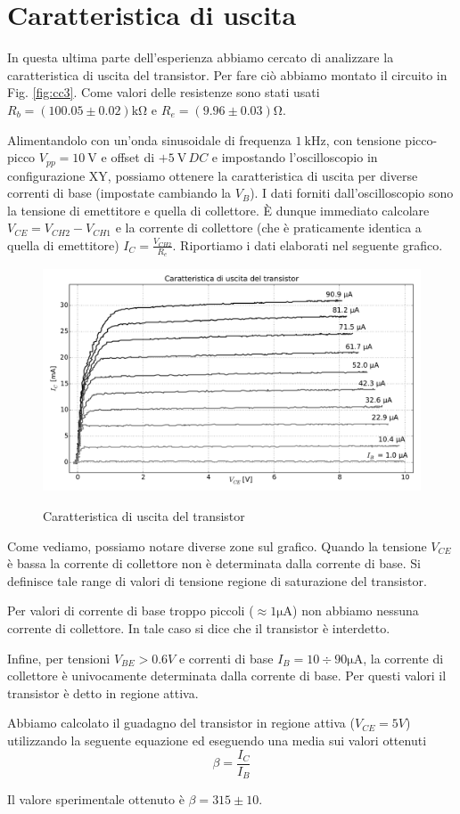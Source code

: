 \section{Caratteristica di uscita}

In questa ultima parte dell'esperienza abbiamo cercato di analizzare la caratteristica di uscita del transistor.
Per fare ciò abbiamo montato il circuito in Fig. \ref{fig:cc3}. Come valori delle resistenze sono stati usati $R_b=(100.05\pm0.02)\si{\kilo\ohm}$ e $R_e=(9.96\pm 0.03)\si{\ohm}$.

Alimentandolo con un'onda sinusoidale di frequenza $\SI{1}{\kilo\hertz}$, con tensione picco-picco $V_{pp} = \SI{10}{\volt}$ e offset di $+\SI{5}{\volt} \, DC$ e impostando l'oscilloscopio in configurazione XY, possiamo ottenere la caratteristica di uscita per diverse correnti di base (impostate cambiando la $V_B$).
I dati forniti dall'oscilloscopio sono la tensione di emettitore e quella di collettore. È dunque immediato calcolare $V_{CE}=V_{CH2}-V_{CH1}$ e la corrente di collettore (che è praticamente identica a quella di emettitore) $I_C=\frac{V_{CH2}}{R_e}$. Riportiamo i dati elaborati nel seguente grafico. 

\begin{figure}[h]
\centering
	\caption{Caratteristica di uscita del transistor}
	\includegraphics[scale=0.45]{xy.pdf}
	\label{fig:xy}
\end{figure}

Come vediamo, possiamo notare diverse zone sul grafico. Quando la tensione $V_{CE}$ è bassa la corrente di collettore non è determinata dalla corrente di base. Si definisce tale range di valori di tensione regione di saturazione del transistor. 

Per valori di corrente di base troppo piccoli ($\approx 1 \si{\micro\ampere}$) non abbiamo nessuna corrente di collettore. In tale caso si dice che il transistor è interdetto.

Infine, per tensioni $V_{BE}>0.6V$ e correnti di base $I_B=10 \div 90 \si{\micro	\ampere}$, la corrente di collettore è univocamente determinata dalla corrente di base. Per questi valori il transistor è detto in regione attiva.

Abbiamo calcolato il guadagno del transistor in regione attiva ($V_{CE}=5V$) utilizzando la seguente equazione ed eseguendo una media sui valori ottenuti
$$\beta=\frac{I_C}{I_B}$$

Il valore sperimentale ottenuto è $\beta=315 \pm 10$.